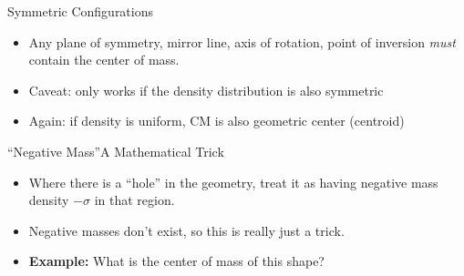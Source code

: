 \documentclass[12pt,compress,aspectratio=169]{beamer}
\begin{document}
\begin{frame}{Symmetric Configurations}
  \begin{itemize}
  \item Any plane of symmetry, mirror line, axis of rotation, point of inversion
    \emph{must} contain the center of mass.
  \item Caveat: only works if the density distribution is also symmetric
  \item Again: if density is uniform, CM is also geometric center (centroid)
  \end{itemize}
\end{frame}



\begin{frame}{``Negative Mass''}{A Mathematical Trick}
  \begin{itemize}
  \item Where there is a ``hole'' in the geometry, treat it as having negative
    mass density $-\sigma$ in that region.
  \item Negative masses don't exist, so this is really just a trick.
  \item\textbf{Example:} What is the center of mass of this shape?
    \begin{center}
    \end{center}
  \end{itemize}
\end{frame}
\end{document}

